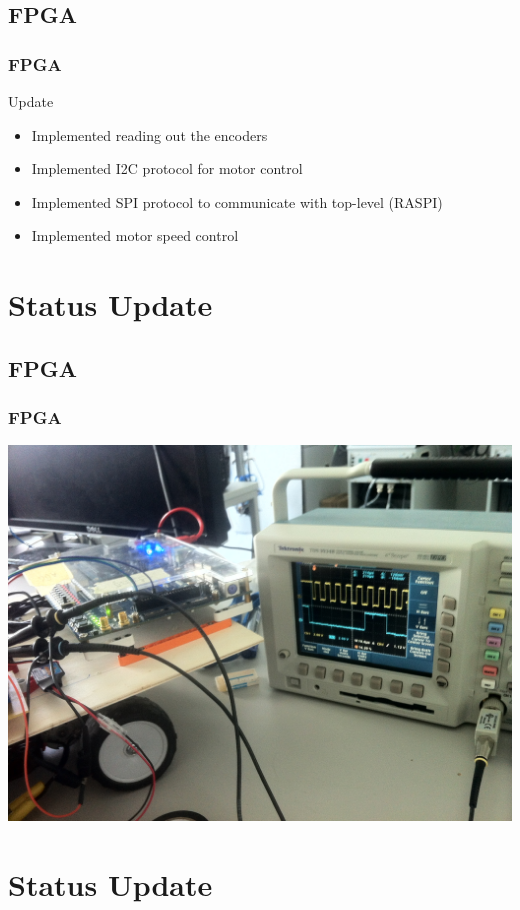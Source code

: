 \documentclass[pdf]{beamer}
\begin{document}
\subsection{FPGA}
\begin{frame}
\frametitle{FPGA}
\begin{exampleblock}{Update}
\begin{itemize}
  \item Implemented reading out the encoders
  \item Implemented I2C protocol for motor control
  \item Implemented SPI protocol to communicate with top-level (RASPI)
  \item Implemented motor speed control
\end{itemize}
\end{exampleblock}
\end{frame}

\section{Status Update}
\subsection{FPGA}
\begin{frame}
\frametitle{FPGA}
  \begin{center}
  \includegraphics[width = \textwidth]{pics/i2c_am_oszi.JPG}
  \end{center}
\end{frame}

\section{Status Update}
\end{document}
